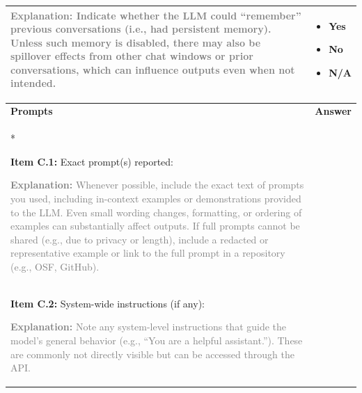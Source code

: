 \documentclass[12pt]{article}
\newcommand{\unchecked}{\ding{111}} %
\begin{document}
\begin{longtable}{|p{}|p{}|}
\textcolor{gray}{{\footnotesize
\textbf{Explanation:} Indicate whether the LLM could “remember” previous conversations (i.e., had persistent memory). Unless such memory is disabled, there may also be spillover effects from other chat windows or prior conversations, which can influence outputs even when not intended. }}  &   \begin{itemize}[leftmargin=*]\setlength{\itemsep}{0pt}\setlength{\parskip}{0pt}
    \item[\unchecked] Yes
    \item[\unchecked] No
    \item[\unchecked] N/A
\end{itemize} \\
\hline
\end{longtable}

\begin{longtable}{|p{}|p{}|}
\hline
\rowcolor{green!20}
\textbf{{Prompts}} & \textbf{Answer} \\*   %
\hline

\textbf{Item C.1:} Exact prompt(s) reported:

\textcolor{gray}{{\footnotesize
\textbf{Explanation:} Whenever possible, include the exact text of prompts you used, including in-context examples or demonstrations provided to the LLM. Even small wording changes, formatting, or ordering of examples can substantially affect outputs. If full prompts cannot be shared (e.g., due to privacy or length), include a redacted or representative example or link to the full prompt in a repository (e.g., OSF, GitHub). }}
&   \\
\hline
\textbf{Item C.2:} System-wide instructions (if any):

\textcolor{gray}{{\footnotesize
\textbf{Explanation:} Note any system-level instructions that guide the model’s general behavior (e.g., “You are a helpful assistant.”). These are commonly not directly visible but can be accessed through the API.
}}  &   \\
\hline
\end{longtable}
\end{document}
